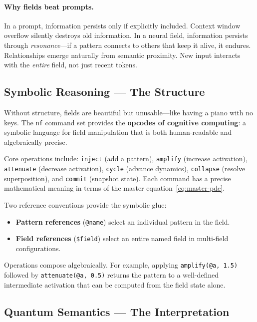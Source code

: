 \paragraph{Why fields beat prompts.}
In a prompt, information persists only if explicitly included.  Context
window overflow silently destroys old information.  In a neural field,
information persists through \emph{resonance}---if a pattern connects
to others that keep it alive, it endures.  Relationships emerge
naturally from semantic proximity.  New input interacts with the
\emph{entire} field, not just recent tokens.

\subsection{Symbolic Reasoning --- The Structure}\label{sec:pillar-symbolic}

Without structure, fields are beautiful but unusable---like having a
piano with no keys.  The \texttt{nf} command set provides the
\textbf{opcodes of cognitive computing}: a symbolic language for field
manipulation that is both human-readable and algebraically precise.

Core operations include:
\texttt{inject} (add a pattern),
\texttt{amplify} (increase activation),
\texttt{attenuate} (decrease activation),
\texttt{cycle} (advance dynamics),
\texttt{collapse} (resolve superposition), and
\texttt{commit} (snapshot state).
Each command has a precise mathematical meaning in terms of the master
equation~\eqref{eq:master-pde}.

Two reference conventions provide the symbolic glue:

\begin{itemize}[leftmargin=1.5em]
\item \textbf{Pattern references} (\texttt{@name}) select an
  individual pattern in the field.
\item \textbf{Field references} (\texttt{\$field}) select an entire
  named field in multi-field configurations.
\end{itemize}

\noindent
Operations compose algebraically.  For example, applying
\texttt{amplify(@a, 1.5)} followed by \texttt{attenuate(@a, 0.5)}
returns the pattern to a well-defined intermediate activation
that can be computed from the field state alone.

\subsection{Quantum Semantics --- The Interpretation}%
\label{sec:pillar-quantum}

